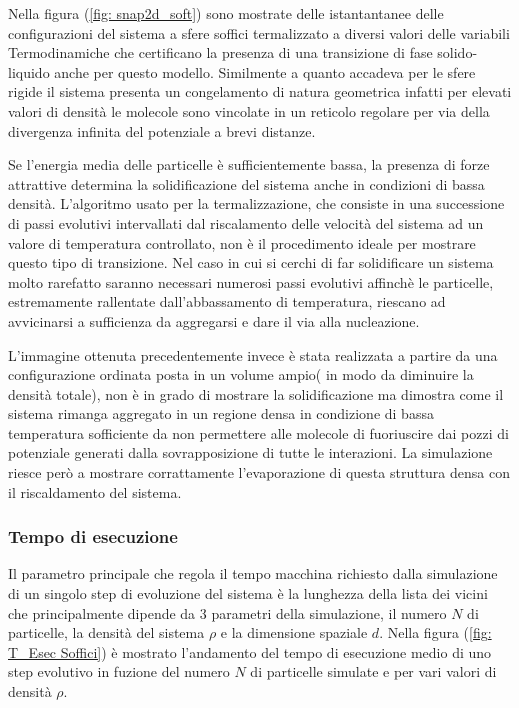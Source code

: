 \documentclass[11pt]{article}
\theoremstyle{plain}
\theoremstyle{remark}
\begin{document}
Nella figura (\ref{fig: snap2d_soft}) sono mostrate delle istantantanee delle configurazioni del sistema a sfere soffici termalizzato a diversi valori delle variabili Termodinamiche che certificano la presenza di una transizione di fase solido-liquido anche per questo modello.
Similmente a quanto accadeva per le sfere rigide il sistema presenta un congelamento di natura geometrica infatti per elevati valori di densità le molecole sono vincolate in un reticolo regolare per via della divergenza infinita del potenziale a brevi distanze.

Se l'energia media delle particelle è sufficientemente bassa, la presenza di forze attrattive determina la solidificazione del sistema anche in condizioni di bassa densità.
L'algoritmo usato per la termalizzazione, che consiste in una successione di passi evolutivi intervallati dal riscalamento delle velocità del sistema ad un valore di temperatura controllato, non è il procedimento ideale per mostrare questo tipo di transizione.
Nel caso in cui si cerchi di far solidificare un sistema molto rarefatto saranno necessari numerosi passi evolutivi affinchè le particelle, estremamente rallentate dall'abbassamento di temperatura, riescano ad avvicinarsi a sufficienza da aggregarsi e dare il via alla nucleazione.

L'immagine ottenuta precedentemente invece è stata realizzata a partire da una configurazione ordinata posta in un volume ampio( in modo da diminuire la densità totale), non è in grado di mostrare la solidificazione ma dimostra come il sistema rimanga aggregato in un regione densa in condizione di bassa temperatura sofficiente da non permettere alle molecole di fuoriuscire dai pozzi di potenziale generati dalla sovrapposizione di tutte le interazioni.
La simulazione riesce però a mostrare corrattamente l'evaporazione di questa struttura densa con il riscaldamento del sistema.

\subsubsection{Tempo di esecuzione}
Il parametro principale che regola il tempo macchina richiesto dalla simulazione di un singolo step di evoluzione del sistema è la lunghezza della lista dei vicini che principalmente dipende da 3 parametri della simulazione, il numero $N$ di particelle, la densità del sistema $\rho$ e la dimensione spaziale $d$.
Nella figura (\ref{fig: T_Esec Soffici}) è mostrato l'andamento del tempo di esecuzione medio di uno step evolutivo in fuzione del numero $N$ di particelle simulate e per vari valori di densità $\rho$.
\end{document}

